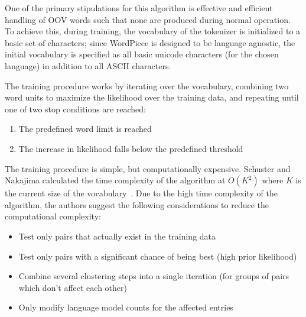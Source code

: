 \documentclass[12pt]{article}
\begin{document}
One of the primary stipulations for this algorithm is effective and efficient handling of OOV words such that none are produced during normal
operation. To achieve this, during training, the vocabulary of the tokenizer is initialized to a basic set of characters; since WordPiece is designed
to be language agnostic, the initial vocabulary is specified as all basic unicode characters (for the chosen language) in addition to all ASCII
characters.

The training procedure works by iterating over the vocabulary, combining two word units to maximize the likelihood over the training data, and
repeating until one of two stop conditions are reached:

\begin{enumerate}
    \item The predefined word limit is reached
    \item The increase in likelihood falls below the predefined threshold
\end{enumerate}

The training procedure is simple, but computationally expensive. Schuster and Nakajima calculated the time complexity of the algorithm at $O(K^2)$
where $K$ is the current size of the vocabulary~\cite{schuster_japanese_2012}. Due to the high time complexity of the algorithm, the authors suggest
the following considerations to reduce the computational complexity:

\begin{itemize}
    \item Test only pairs that actually exist in the training data
    \item Test only pairs with a significant chance of being best (high prior likelihood)
    \item Combine several clustering steps into a single iteration (for groups of pairs which don't affect each other)
    \item Only modify language model counts for the affected entries
\end{itemize}
\end{document}
